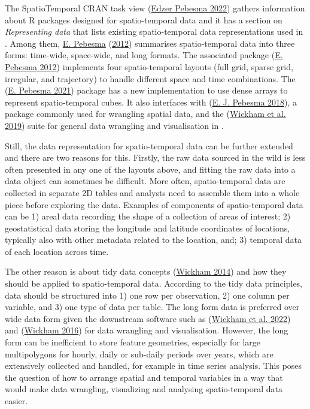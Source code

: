 \documentclass{article}
\begin{document}
The SpatioTemporal CRAN task view (\protect\hyperlink{ref-ctvspatiotemporal}{Edzer Pebesma 2022}) gathers information about R packages designed for spatio-temporal data and it has a section on \emph{Representing data} that lists existing spatio-temporal data representations used in . Among them, \protect\hyperlink{ref-spacetime}{E. Pebesma} (\protect\hyperlink{ref-spacetime}{2012}) summarises spatio-temporal data into three forms: time-wide, space-wide, and long formats. The associated package  (\protect\hyperlink{ref-spacetime}{E. Pebesma 2012}) implements four spatio-temporal layouts (full grid, sparse grid, irregular, and trajectory) to handle different space and time combinations. The  (\protect\hyperlink{ref-stars}{E. Pebesma 2021}) package has a new implementation to use dense arrays to represent spatio-temporal cubes. It also interfaces with  (\protect\hyperlink{ref-sf}{E. J. Pebesma 2018}), a package commonly used for wrangling spatial data, and the  (\protect\hyperlink{ref-tidyverse}{Wickham et al. 2019}) suite for general data wrangling and visualisation in .

Still, the data representation for spatio-temporal data can be further extended and there are two reasons for this. Firstly, the raw data sourced in the wild is less often presented in any one of the layouts above, and fitting the raw data into a data object can sometimes be difficult. More often, spatio-temporal data are collected in separate 2D tables and analysts need to assemble them into a whole piece before exploring the data. Examples of components of spatio-temporal data can be 1) areal data recording the shape of a collection of areas of interest; 2) geostatistical data storing the longitude and latitude coordinates of locations, typically also with other metadata related to the location, and; 3) temporal data of each location across time.

The other reason is about tidy data concepts (\protect\hyperlink{ref-tidydata}{Wickham 2014}) and how they should be applied to spatio-temporal data. According to the tidy data principles, data should be structured into 1) one row per observation, 2) one column per variable, and 3) one type of data per table. The long form data is preferred over wide data form given the downstream software such as  (\protect\hyperlink{ref-dplyr}{Wickham et al. 2022}) and  (\protect\hyperlink{ref-ggplot2}{Wickham 2016}) for data wrangling and visualisation. However, the long form can be inefficient to store feature geometries, especially for large multipolygons for hourly, daily or sub-daily periods over years, which are extensively collected and handled, for example in time series analysis. This poses the question of how to arrange spatial and temporal variables in a way that would make data wrangling, visualizing and analysing spatio-temporal data easier.
\end{document}
